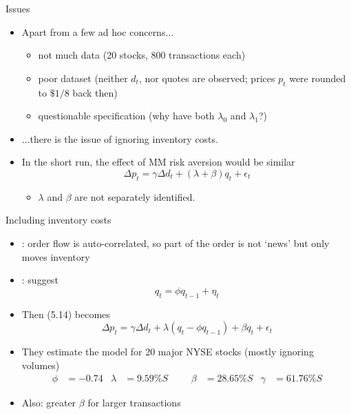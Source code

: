 \documentclass[english,10pt
,aspectratio=169
]{beamer}
\begin{document}
\begin{frame}{Issues}
	\begin{itemize}
		\item Apart from a few ad hoc concerns...
		\begin{itemize}
			\item not much data (20 stocks, 800 transactions each)
			\item poor dataset (neither $d_t$, nor quotes are observed; prices $p_t$ were rounded to $\$1/8$ back then)
			\item questionable specification (why have both $\lambda_0$ and $\lambda_1$?)
		\end{itemize}
		\item ...there is the issue of ignoring inventory costs.
		\item In the short run, the effect of MM risk aversion would be similar
		\begin{equation} \tag{5.14}
		\Delta p_t = \gamma \Delta d_t + (\lambda + \beta) q_t + \epsilon_t
		\end{equation}
		\begin{itemize}
			\item $\lambda$ and $\beta$ are not separately identified.
		\end{itemize}
	\end{itemize}
\end{frame}


\begin{frame}[label=extending]{Including inventory costs}
	\begin{itemize}
		\item \textbf{\cite{hasbrouck_trades_1988}}: order flow is auto-correlated, so part of the order is not `news' but only moves inventory
		\item \textbf{\cite{huang_components_1997}}: suggest
		\begin{equation}\tag{5.17}
		q_t = \phi q_{t-1} + \eta_t
		\end{equation}
		\item Then (5.14) becomes \hyperlink{derivation}{}
		\begin{equation} \tag{5.21}
		\Delta p_t = \gamma \Delta d_t + \lambda (q_t - \phi q_{t-1}) + \beta q_t + \epsilon_t
		\end{equation}
		\item They estimate the model for 20 major NYSE stocks (mostly ignoring volumes)
		\begin{align*}
			\phi &= -0.74	& \lambda &= 9.59\% S
			&&&
			\beta &= 28.65\% S	& \gamma &= 61.76\% S
		\end{align*}
		\item Also: greater $\beta$ for larger transactions
	\end{itemize}
\end{frame}
\end{document}
